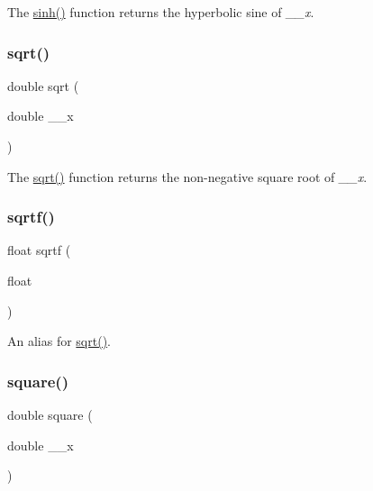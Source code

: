 The \hyperlink{group__avr__math_ga00265cea3ae92c52d2aa9cc32f2e6557}{sinh()} function returns the hyperbolic sine of {\itshape \+\_\+\+\_\+x}. \mbox{\label{group__avr__math_gaac21324d984f0af0fb87a613efb69d77}} 
\subsubsection{\texorpdfstring{sqrt()}{sqrt()}}
{\footnotesize\ttfamily double sqrt (\begin{DoxyParamCaption}\item[{double}]{\+\_\+\+\_\+x }\end{DoxyParamCaption})}

The \hyperlink{group__avr__math_gaac21324d984f0af0fb87a613efb69d77}{sqrt()} function returns the non-\/negative square root of {\itshape \+\_\+\+\_\+x}. \mbox{\label{group__avr__math_ga64f14b85f83a522d1b611612027cfe5a}} 
\subsubsection{\texorpdfstring{sqrtf()}{sqrtf()}}
{\footnotesize\ttfamily float sqrtf (\begin{DoxyParamCaption}\item[{float}]{ }\end{DoxyParamCaption})}

An alias for \hyperlink{group__avr__math_gaac21324d984f0af0fb87a613efb69d77}{sqrt()}. \mbox{\label{group__avr__math_gabb95d8256ff81d58f092c065ea204293}} 
\subsubsection{\texorpdfstring{square()}{square()}}
{\footnotesize\ttfamily double square (\begin{DoxyParamCaption}\item[{double}]{\+\_\+\+\_\+x }\end{DoxyParamCaption})}

